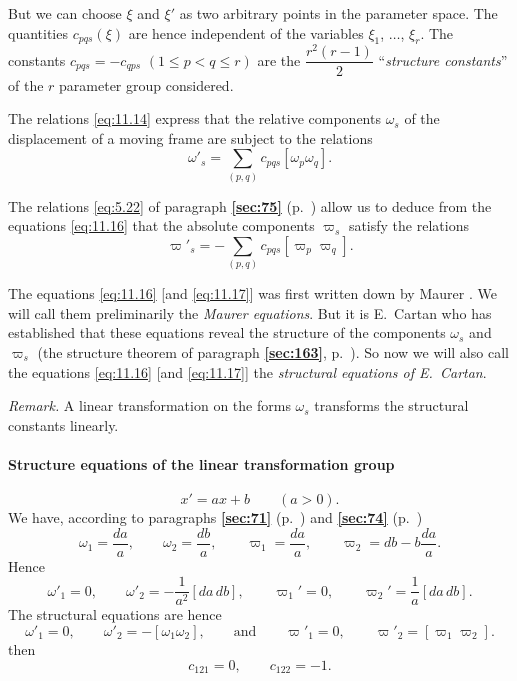 \documentclass[leqno,11pt]{book}
\numberwithin{equation}{chapter}
\theoremstyle{shape1}
\theoremstyle{shapesmall}
\newcommand{\fsref}[1]{{\rm\textsection\textbf{\ref{sec:#1}}}}
\newcommand{\vp}{\varpi}
\newcommand{\somespace}{\vspace{9pt}}
\begin{document}
But we can choose $\xi$ and $\xi'$ as two arbitrary points in the parameter space. The quantities $c_{pqs}(\xi)$ are hence independent of the variables $\xi_{1}$, $\dots$, $\xi_{r}$. The constants $c_{pqs}=-c_{qps}$ $(1\le p<q\le r)$ are the $\dfrac{r^{2}(r-1)}{2}$ ``\emph{structure constants}'' of the $r$ parameter group considered.

The relations \eqref{eq:11.14} express that the relative components $\omega_{s}$ of the displacement of a moving frame are subject to the relations
\begin{equation}
  \label{eq:11.16}
  \omega'_{s}=\sum_{(p,q)}c_{pqs}[\omega_{p}\omega_{q}].
\end{equation}

The relations \eqref{eq:5.22} of paragraph \fsref{75} (p.~\pageref{eq:5.22}) allow us to deduce from the equations \eqref{eq:11.16} that the absolute components $\vp_{s}$ satisfy the relations
\begin{equation}
  \label{eq:11.17}
  \vp'_{s}=-\sum_{(p,q)}c_{pqs}[\vp_{p}\vp_{q}].
\end{equation}

The equations \eqref{eq:11.16} [and \eqref{eq:11.17}] was first written down by Maurer \cite{3}. We will call them preliminarily the \emph{Maurer equations}. But it is E.~Cartan who has established that these equations reveal the structure of the components $\omega_{s}$ and $\vp_{s}$ (the structure theorem of paragraph \fsref{163}, p.~\pageref{sec:163}). So now we will also call the equations \eqref{eq:11.16} [and \eqref{eq:11.17}] the \emph{structural equations of E.~Cartan}.

\somespace

\emph{Remark.} A linear transformation on the forms $\omega_{s}$ transforms the structural constants linearly.


\paragraph{Structure equations of the linear transformation group}
\label{sec:158}
\[
x'=ax+b\qquad(a>0).
\]
We have, according to paragraphs \fsref{71} (p.~\pageref{sec:71}) and \fsref{74} (p.~\pageref{sec:74})
\[
\omega_{1}=\frac{da}{a},\qquad\omega_{2}=\frac{db}{a},\qquad\vp_{1}=\frac{da}{a},\qquad\vp_{2}=db-b\frac{da}{a}.
\]
Hence
\[
\omega'_{1}=0,\qquad\omega'_{2}=-\frac{1}{a^{2}}[da\,db],\qquad\vp_{1}'=0,\qquad\vp_{2}'=\frac{1}{a}[da\,db].
\]
The structural equations are hence
\[
\omega'_{1}=0,\qquad\omega'_{2}=-[\omega_{1}\omega_{2}],\qquad\text{and}\qquad\vp'_{1}=0,\qquad\vp'_{2}=[\vp_{1}\vp_{2}].
\]
then
\[
c_{121}=0,\qquad c_{122}=-1.
\]
\end{document}
